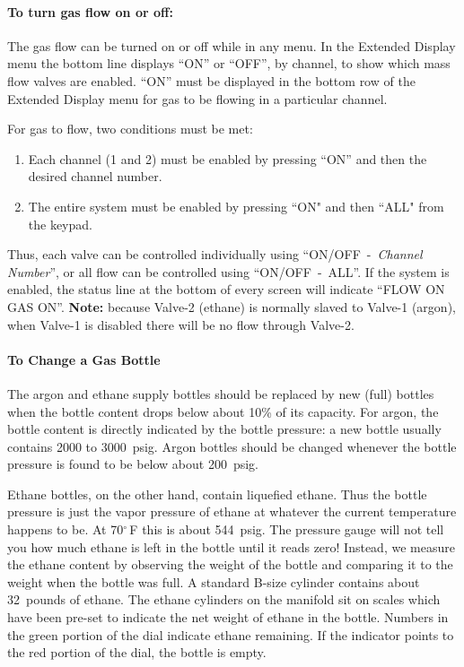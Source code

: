 \paragraph{To turn gas flow on or off:}

The gas flow can be turned on or off while in any menu.  In the
Extended Display menu the bottom line displays ``ON'' or ``OFF'', by
channel, to show which mass flow valves are enabled.  ``ON'' must be
displayed in the bottom row of the Extended Display menu for gas to be
flowing in a particular channel.

For gas to flow, two conditions must be met: 
\begin{enumerate}
\item Each channel (1 and 2) must be enabled by pressing ``ON'' and then the
  desired channel number.
\item The entire system must be enabled by pressing ``ON" and then ``ALL" from
  the keypad.
\end{enumerate}
Thus, each valve can be controlled individually using ``ON/OFF~-~\emph{Channel
Number}'', or all flow can be controlled using ``ON/OFF~-~ALL''. If the system
is enabled, the status line at the bottom of every screen will indicate ``FLOW
ON GAS ON''. {\bf Note:} because Valve-2 (ethane) is normally slaved to Valve-1
(argon), when Valve-1 is disabled there will be no flow through Valve-2.

\paragraph{To Change a Gas Bottle}

The argon and ethane supply bottles should be replaced by new (full)
bottles when the bottle content drops below about 10\% of its
capacity.  For argon, the bottle content is directly indicated by the
bottle pressure: a new bottle usually contains 2000 to
3000~psig. Argon bottles should be changed whenever the bottle
pressure is found to be below about 200~psig. 

Ethane bottles, on the
other hand, contain liquefied ethane. Thus the bottle pressure is just
the vapor pressure of ethane at whatever the current temperature
happens to be. At 70$^\circ$\,F this is about 544~psig. The pressure gauge
will not tell you how much ethane is left in the bottle until it reads
zero! Instead, we measure the ethane content by observing the weight
of the bottle and comparing it to the weight when the bottle was
full. A standard B-size cylinder contains about 32~pounds of ethane.
The ethane cylinders on the manifold sit on scales which have been 
pre-set to indicate the net weight of ethane in the bottle.
Numbers in the green portion of the dial indicate ethane remaining.
If the indicator points to the red portion of the dial, the bottle
is empty.

